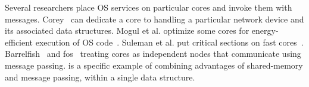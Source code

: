 Several researchers place OS services on particular cores and invoke them with
messages.  Corey~\cite{corey:osdi08} can dedicate a core to handling a
particular network device and its associated data structures.  Mogul et
al. optimize some cores for energy-efficient execution of OS
code~\cite{mogul:micro}.  Suleman et al. put critical sections on fast
cores~\cite{suleman:acs}.  Barrelfish~\cite{barrelfish} and
fos~\cite{wentzlaff:fos} treating cores as independent nodes that communicate
using message passing.  \cphash{} is a specific example of combining advantages
of shared-memory and message passing, within a single data structure.

